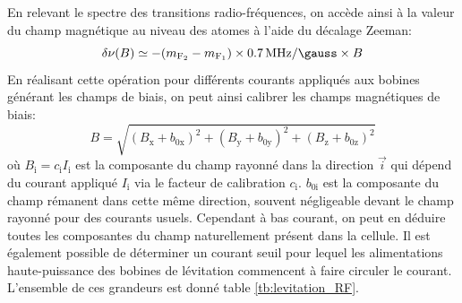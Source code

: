 En relevant le spectre des transitions radio-fréquences, on accède ainsi à la valeur du champ magnétique au niveau des atomes à l'aide du décalage Zeeman:
\begin{equation}
\delta \nu (B)\simeq -(m_{\mathrm{F_2}} - m_{\mathrm{F_1}} ) \times \SI{0.7}{\mega\hertz\per\gauss} \times B
\label{eq:levitation_RF}
\end{equation}
En réalisant cette opération pour différents courants appliqués aux bobines générant les champs de biais, on peut ainsi calibrer les champs magnétiques de biais:
\begin{equation}
B=\sqrt{(B_{\mathrm{x}}+b_{\mathrm{0x}})^2+(B_{\mathrm{y}}+b_{\mathrm{0y}})^2+(B_{\mathrm{z}}+b_{\mathrm{0z}})^2}
\end{equation}
où $B_{\mathrm{i}}=c_{\mathrm{i}} I_{\mathrm{i}}$ est la composante du champ rayonné dans la direction $\vec{i}$ qui dépend du courant appliqué $I_{\mathrm{i}}$ via le facteur de calibration $c_{\mathrm{i}}$. $b_{\mathrm{0i}}$ est la composante du champ rémanent dans cette même direction, souvent négligeable devant le champ rayonné pour des courants usuels. Cependant à bas courant, on peut en déduire toutes les composantes du champ naturellement présent dans la cellule. Il est également possible de déterminer un courant seuil pour lequel les alimentations haute-puissance des bobines de lévitation commencent à faire circuler le courant. L'ensemble de ces grandeurs est donné table \ref{tb:levitation_RF}.

